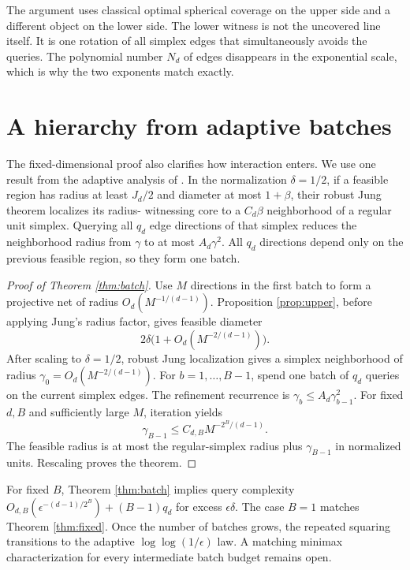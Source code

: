 \documentclass{article}
\theoremstyle{definition}
\begin{document}
The argument uses classical optimal spherical coverage on the upper side and a different object on the lower side.  The lower witness is not the uncovered line itself.  It is one rotation of all simplex edges that simultaneously avoids the queries.  The polynomial number $N_d$ of edges disappears in the exponential scale, which is why the two exponents match exactly.

\section{A hierarchy from adaptive batches}                         \label{sec:batch}

The fixed-dimensional proof also clarifies how interaction enters.  We use one result from the adaptive analysis of \citet{filmus2026optimal}.  In the normalization $\delta=1/2$, if a feasible region has radius at least $J_d/2$ and diameter at most $1+\beta$, their robust Jung theorem localizes its radius- witnessing core to a $C_d\beta$ neighborhood of a regular unit simplex.  Querying all $q_d$ edge directions of that simplex reduces the neighborhood radius from $\gamma$ to at most $A_d\gamma^2$.  All $q_d$ directions depend only on the previous feasible region, so they form one batch.

\begin{proof}[Proof of Theorem \ref{thm:batch}]
Use $M$ directions in the first batch to form a projective net of radius $O_d(M^{-1/(d-1)})$.  Proposition \ref{prop:upper}, before applying Jung's radius factor, gives feasible diameter \[ 2\delta\big(1+O_d(M^{-2/(d-1)})\big). \] After scaling to $\delta=1/2$, robust Jung localization gives a simplex neighborhood of radius $\gamma_0=O_d(M^{-2/(d-1)})$.  For $b=1,\ldots,B-1$, spend one batch of $q_d$ queries on the current simplex edges.  The refinement recurrence is $\gamma_b\leq A_d\gamma_{b-1}^2$.  For fixed $d,B$ and sufficiently large $M$, iteration yields \[ \gamma_{B-1}\leq C_{d,B}M^{-2^B/(d-1)}. \] The feasible radius is at most the regular-simplex radius plus $\gamma_{B-1}$ in normalized units.  Rescaling proves the theorem.
\end{proof}

For fixed $B$, Theorem \ref{thm:batch} implies query complexity $O_{d,B}(\epsilon^{-(d-1)/2^B})+(B-1)q_d$ for excess $\epsilon\delta$.  The case $B=1$ matches Theorem \ref{thm:fixed}.  Once the number of batches grows, the repeated squaring transitions to the adaptive $\log\log(1/\epsilon)$ law.  A matching minimax characterization for every intermediate batch budget remains open.
\end{document}
